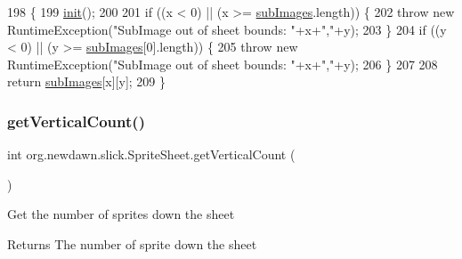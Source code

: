 \begin{DoxyCode}
198                                            \{
199         \mbox{\hyperlink{classorg_1_1newdawn_1_1slick_1_1_image_a94d180c9218ba1444a0496a1898ec345}{init}}();
200         
201         \textcolor{keywordflow}{if} ((x < 0) || (x >= \mbox{\hyperlink{classorg_1_1newdawn_1_1slick_1_1_sprite_sheet_a4aa6be08aecfbd439794ca984ce6e44c}{subImages}}.length)) \{
202             \textcolor{keywordflow}{throw} \textcolor{keyword}{new} RuntimeException(\textcolor{stringliteral}{"SubImage out of sheet bounds: "}+x+\textcolor{stringliteral}{","}+y);
203         \}
204         \textcolor{keywordflow}{if} ((y < 0) || (y >= \mbox{\hyperlink{classorg_1_1newdawn_1_1slick_1_1_sprite_sheet_a4aa6be08aecfbd439794ca984ce6e44c}{subImages}}[0].length)) \{
205             \textcolor{keywordflow}{throw} \textcolor{keyword}{new} RuntimeException(\textcolor{stringliteral}{"SubImage out of sheet bounds: "}+x+\textcolor{stringliteral}{","}+y);
206         \}
207         
208         \textcolor{keywordflow}{return} \mbox{\hyperlink{classorg_1_1newdawn_1_1slick_1_1_sprite_sheet_a4aa6be08aecfbd439794ca984ce6e44c}{subImages}}[x][y];
209     \}
\end{DoxyCode}
\mbox{\label{classorg_1_1newdawn_1_1slick_1_1_sprite_sheet_a3fdf40d87de7a4f360c5bdcf637cc6a4}} 
\subsubsection{\texorpdfstring{get\+Vertical\+Count()}{getVerticalCount()}}
{\footnotesize\ttfamily int org.\+newdawn.\+slick.\+Sprite\+Sheet.\+get\+Vertical\+Count (\begin{DoxyParamCaption}{ }\end{DoxyParamCaption})\hspace{0.3cm}{\ttfamily [inline]}}

Get the number of sprites down the sheet

\begin{DoxyReturn}{Returns}
The number of sprite down the sheet 
\end{DoxyReturn}

